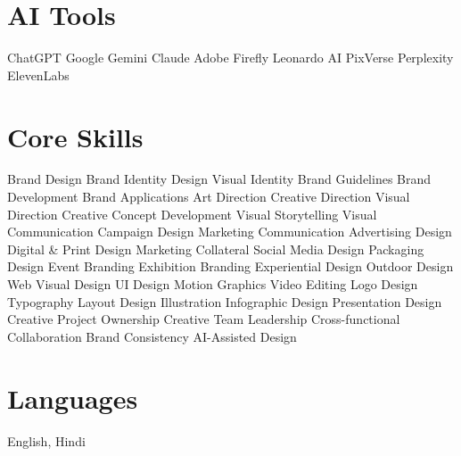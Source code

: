 \documentclass[a4paper,9pt]{article}
\begin{document}
\section{AI Tools}

ChatGPT \textbar{} Google Gemini \textbar{} Claude \textbar{} Adobe Firefly \textbar{} Leonardo AI \textbar{} PixVerse \textbar{} Perplexity \textbar{} ElevenLabs

\section{Core Skills}

Brand Design \textbar{} Brand Identity Design \textbar{} Visual Identity \textbar{} Brand Guidelines \textbar{} Brand Development \textbar{} Brand Applications \textbar{} Art Direction \textbar{} Creative Direction \textbar{} Visual Direction \textbar{} Creative Concept Development \textbar{} Visual Storytelling \textbar{} Visual Communication \textbar{} Campaign Design \textbar{} Marketing Communication \textbar{} Advertising Design \textbar{} Digital \& Print Design \textbar{} Marketing Collateral \textbar{} Social Media Design \textbar{} Packaging Design \textbar{} Event Branding \textbar{} Exhibition Branding \textbar{} Experiential Design \textbar{} Outdoor Design \textbar{} Web Visual Design \textbar{} UI Design \textbar{} Motion Graphics \textbar{} Video Editing \textbar{} Logo Design \textbar{} Typography \textbar{} Layout Design \textbar{} Illustration \textbar{} Infographic Design \textbar{} Presentation Design \textbar{} Creative Project Ownership \textbar{} Creative Team Leadership \textbar{} Cross-functional Collaboration \textbar{} Brand Consistency \textbar{} AI-Assisted Design

\section{Languages}
{\color{black}English, Hindi}
\end{document}
